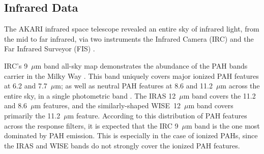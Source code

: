 \documentclass[preprint2,longabstract]{aastex}
\begin{document}
\subsection{Infrared Data}

     The AKARI infrared space telescope revealed an entire sky of infrared light, from the mid to far infrared, via two instruments \citep{akari07} the Infrared Camera (IRC)\citep{irc07} and the Far Infrared Surveyor (FIS) \citep{fis07}.

     IRC's 9~$\mu$m band all-sky map demonstrates the abundance of the PAH bands carrier in the Milky Way \citep{ishihara10}. This band uniquely covers major ionized PAH features at 6.2 and 7.7~$\mu$m; as well as neutral PAH features at 8.6 and 11.2~$\mu$m across the entire sky, in a single photometric band \citep{onaka99,irc07}. The IRAS 12~$\mu$m band covers the 11.2 and 8.6~$\mu$m features, and the similarly-shaped WISE~12~$\mu$m band covers primarily the 11.2~$\mu$m feature. According to this distribution of PAH features across the response filters, it is expected that the IRC 9~$\mu$m band is the one most dominated by PAH emission. This is especially in the case of ionized PAHs, since the IRAS and WISE bands do not strongly cover the ionized PAH features.
\end{document}
